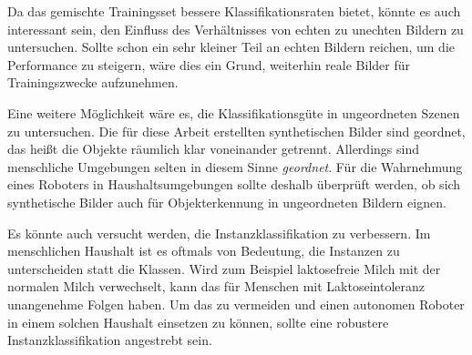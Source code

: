 Da das gemischte Trainingsset bessere Klassifikationsraten bietet, könnte es auch interessant sein, den Einfluss des Verhältnisses von echten zu unechten Bildern zu untersuchen. Sollte schon ein sehr kleiner Teil an echten Bildern reichen, um die Performance zu steigern, wäre dies ein Grund, weiterhin reale Bilder für Trainingszwecke aufzunehmen. \par 

Eine weitere Möglichkeit wäre es, die Klassifikationsgüte in ungeordneten Szenen zu untersuchen. Die für diese Arbeit erstellten synthetischen Bilder sind geordnet, das heißt die Objekte räumlich klar voneinander getrennt. Allerdings sind menschliche Umgebungen selten in diesem Sinne \textit{geordnet}. Für die Wahrnehmung eines Roboters in Haushaltsumgebungen sollte deshalb überprüft werden, ob sich synthetische Bilder auch für Objekterkennung in ungeordneten Bildern eignen. \par 

Es könnte auch versucht werden, die Instanzklassifikation zu verbessern. Im menschlichen Haushalt ist es oftmals von Bedeutung, die Instanzen zu unterscheiden statt die Klassen. Wird zum Beispiel laktosefreie Milch mit der normalen Milch verwechselt, kann das für Menschen mit Laktoseintoleranz unangenehme Folgen haben. Um das zu vermeiden und einen autonomen Roboter in einem solchen Haushalt einsetzen zu können, sollte eine robustere Instanzklassifikation angestrebt sein. 